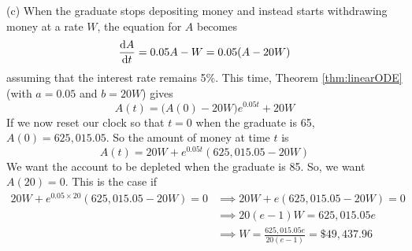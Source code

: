 \begin{eg}
\noindent(c) When the graduate stops depositing money and instead
starts withdrawing money at a rate $W$, the equation for $A$ becomes
\begin{equation*}
\diff{A}{t}= 0.05 A-W= 0.05 (A-20 W)
\end{equation*}
assuming that the interest rate remains 5\%.
This time, Theorem \ref{thm:linearODE} (with $a=0.05$ and $b=20W$) gives
\begin{equation*}
A(t)=\big(A(0)-20W\big)e^{0.05 t} + 20W
\end{equation*}
If we now reset our clock so that $t=0$ when the graduate is 65,
$A(0)=625,015.05$. So the amount of money at time $t$ is
\begin{equation*}
A(t)=20W+ e^{0.05 t}(625,015.05-20W)
\end{equation*}
We want the account to be depleted when the graduate is 85. So, we
want $A(20)=0$. This is the case if
\begin{align*}
20W+ e^{0.05\times 20}(625,015.05-20W)=0
&\implies
20W+ e(625,015.05-20W)=0\\
&\implies
20(e-1)W= 625,015.05e\\
&\implies
W=\frac{625,015.05e}{20(e-1)}=\$49,437.96
\end{align*}
\end{eg}




